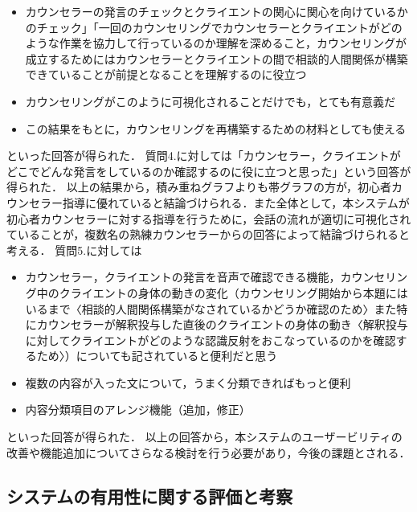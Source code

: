 \documentclass[shuuron]{kuee}
\begin{document}
\begin{itemize}

  \item カウンセラーの発言のチェックとクライエントの関心に関心を向けているかのチェック」「一回のカウンセリングでカウンセラーとクライエントがどのような作業を協力して行っているのか理解を深めること，カウンセリングが成立するためにはカウンセラーとクライエントの間で相談的人間関係が構築できていることが前提となることを理解するのに役立つ
  \item カウンセリングがこのように可視化されることだけでも，とても有意義だ
  \item この結果をもとに，カウンセリングを再構築するための材料としても使える
\end{itemize}
といった回答が得られた．
質問4.に対しては「カウンセラー，クライエントがどこでどんな発言をしているのか確認するのに役に立つと思った」という回答が得られた．
以上の結果から，積み重ねグラフよりも帯グラフの方が，初心者カウンセラー指導に優れていると結論づけられる．また全体として，本システムが初心者カウンセラーに対する指導を行うために，会話の流れが適切に可視化されていることが，複数名の熟練カウンセラーからの回答によって結論づけられると考える．
質問5.に対しては

\begin{itemize}

  \item カウンセラー，クライエントの発言を音声で確認できる機能，カウンセリング中のクライエントの身体の動きの変化（カウンセリング開始から本題にはいるまで〈相談的人間関係構築がなされているかどうか確認のため〉また特にカウンセラーが解釈投与した直後のクライエントの身体の動き〈解釈投与に対してクライエントがどのような認識反射をおこなっているのかを確認するため〉）についても記されていると便利だと思う
  \item 複数の内容が入った文について，うまく分類できればもっと便利
  \item 内容分類項目のアレンジ機能（追加，修正）
\end{itemize}
といった回答が得られた．
以上の回答から，本システムのユーザービリティの改善や機能追加についてさらなる検討を行う必要があり，今後の課題とされる．



\subsection{システムの有用性に関する評価と考察}%

\end{document}
